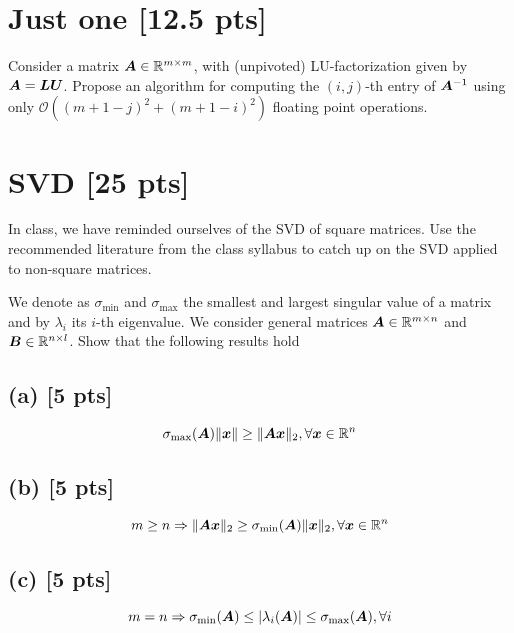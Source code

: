 \documentclass[twoside,10pt]{article}
\begin{document}
\section{Just one [12.5 pts]}
Consider a matrix $\bm{A} \in \mathbb{R}^{m \times m}$, with (unpivoted) LU-factorization given by $\bm{A} = \bm{L} \bm{U}$. 
Propose an algorithm for computing the $(i, j)$-th entry of $\bm{A}^{-1}$ using only $\mathcal{O}\left(\left(m + 1 - j\right)^2 + \left(m + 1 - i\right)^2\right)$ floating point operations. 

\section{SVD [25 pts]}
In class, we have reminded ourselves of the SVD of square matrices. 
Use the recommended literature from the class syllabus to catch up on the SVD applied to non-square matrices. 

We denote as $\sigma_{\mathrm{min}}$ and $\sigma_{\mathrm{max}}$ the smallest and largest singular value of a matrix and by $\lambda_{i}$ its $i$-th eigenvalue. 
We consider general matrices $\bm{A} \in \mathbb{R}^{m \times n}$ and $\bm{B} \in \mathbb{R}^{n \times l}$.
Show that the following results hold 

\subsection*{(a) [5 pts]}
  \begin{equation*}
    \sigma_{\mathrm{max}}(\bm{A}) \|\bm{x}\| \geq \|\bm{A} \bm{x}\|_2, \forall \bm{x} \in \mathbb{R}^n
  \end{equation*}
\subsection*{(b) [5 pts]}
  \begin{equation*}
    m \geq n \Rightarrow \|\mtx{A}\vct{x}\|_2 \geq \sigma_{\mathrm{min}}\left(\mtx{A}\right) \|\vct{x}\|_2, \forall \vct{x} \in \R^n
  \end{equation*}
\subsection*{(c) [5 pts]}
  \begin{equation*}
    m = n \Rightarrow \sigma_{\mathrm{min}}\left(\mtx{A}\right) \leq \left|\lambda_{i}\left(\mtx{A}\right)\right| \leq \sigma_{\mathrm{max}}\left(\mtx{A}\right), \forall i 
  \end{equation*}
\end{document}
